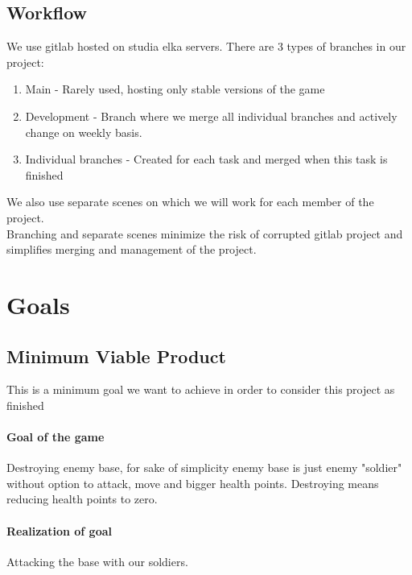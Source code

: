 \documentclass{article}
\begin{document}
\subsection{Workflow}
We use gitlab hosted on studia elka servers. There are 3 types of branches in our project:
\begin{enumerate}
    \item Main - Rarely used, hosting only stable versions of the game 
    \item Development - Branch where we merge all individual branches and actively change on weekly basis.
    \item Individual branches - Created for each task and merged when this task is finished
\end{enumerate}
We also use separate scenes on which we will work for each member of the project. \\
Branching and separate scenes minimize the risk of corrupted gitlab project and simplifies merging and management of the project.

\section{Goals}

\subsection{Minimum Viable Product}
This is a minimum goal we want to achieve in order to consider this project as finished \\ 
\paragraph{Goal of the game} Destroying enemy base, for sake of simplicity enemy base is just enemy "soldier" without option to attack, move and bigger health points. Destroying means reducing health points to zero.
\paragraph{Realization of goal} Attacking the base with our soldiers.
\end{document}
